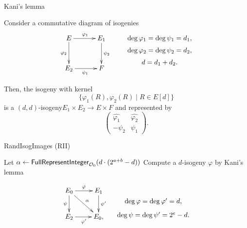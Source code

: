 \begin{frame}{Kani's lemma}
    \begin{lemma}
        Consider a commutative diagram of isogenies
        \vspace{-10pt}
        \begin{align*}
            \xymatrix@C=30pt@R=30pt{
                E \ar[r]^{\varphi_1} \ar[d]_{\varphi_2} & E_1 \ar[d]^{\psi_2}\\
                E_2 \ar[r]_{\psi_1} & F
            }
            \qquad
            \xymatrix@R=0.3em{
                \deg\varphi_1 = \deg\psi_1 = d_1,\\
                \deg\varphi_2 = \deg\psi_2 = d_2,\\
                d = d_1 + d_2.
            }
        \end{align*}

        Then, the isogeny with kernel
        $$\{\varphi_1(R), \varphi_2(R) \mid R \in E[d]\}$$
        is a $(d,d)$-isogeny$E_1 \times E_2 \to E \times F$ and represented by
        \vspace{-10pt}
        \begin{equation*}
            \begin{pmatrix}
                \hat{\varphi_1} & \hat{\varphi_2}\\
                -\psi_2 & \psi_1
            \end{pmatrix}.
        \end{equation*}
    \end{lemma}
\end{frame}

\begin{frame}{RandIsogImages (RII)}
    \begin{algorithm}[H]
        \caption{\textsf{RandIsogImages}}
        \BlankLine
        Let $\alpha \leftarrow \textsf{FullRepresentInteger}_{\mathcal{O}_0}(d\cdot(2^{a+b} - d))$\;
        Compute a $d$-isogeny $\varphi$ by Kani's lemma\;
        \Return{$\varphi$}\;
    \end{algorithm}

    \vspace*{5pt}
    \begin{equation*}
        \xymatrix{
            E_0 \ar[r]^\varphi \ar[d]_\psi \ar[dr]^{\alpha} & E_1 \ar[d]^{\psi'} \\
            E_2 \ar[r]_{\varphi'} & E_0,
        }
        \hspace*{10pt}
        \xymatrix@R=5pt{
            \\
            \deg\varphi = \deg\varphi' = d,\\
            \deg\psi = \deg\psi' = 2^e - d.
        }
    \end{equation*}
\end{frame}